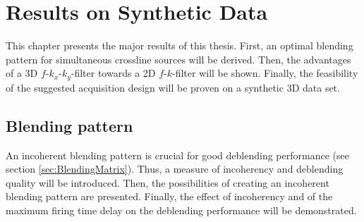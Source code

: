 \chapter{Results on Synthetic Data} \label{chap:ResultsSynData}

This chapter presents the major results of this thesis. First, an optimal blending pattern for simultaneous crossline sources will be derived. Then, the advantages of a 3D $f$-$k_x$-$k_y$-filter towards a 2D $f$-$k$-filter will be shown. Finally, the feasibility of the suggested acquisition design will be proven on a synthetic 3D data set. 
 
\section{Blending pattern}

An incoherent blending pattern is crucial for good deblending performance (see section \ref{sec:BlendingMatrix}). Thus, a measure of incoherency and deblending quality will be introduced. Then, the possibilities of creating an incoherent blending pattern are presented. Finally, the effect of incoherency and of the maximum firing time delay on the deblending performance will be demonstrated.

